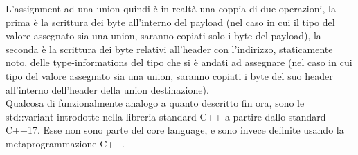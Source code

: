 L’assignment ad una union quindi è in realtà una coppia di due operazioni, la prima è la scrittura 
dei byte all’interno del payload (nel caso in cui il tipo del valore assegnato sia una union, saranno 
copiati solo i byte del payload), la seconda è la scrittura dei byte relativi all’header con l’indirizzo, 
staticamente noto, delle type-informations del tipo che si è andati ad assegnare 
(nel caso in cui tipo del valore assegnato sia una union, saranno copiati i byte del suo 
header all’interno dell’header della union destinazione). \\

Qualcosa di funzionalmente analogo a quanto descritto fin ora, sono le std::variant introdotte 
nella libreria standard C++ a partire dallo standard C++17. Esse non sono parte del core language, 
e sono invece definite usando la metaprogrammazione C++. \\